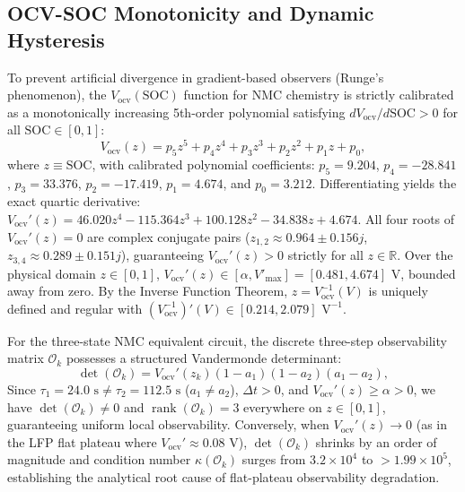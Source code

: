 \documentclass[balance,nocopyright,upint,varvw,hyphenate,barcolor=NavyBlue,nolists]{asmejour}
\begin{document}
\subsection{OCV-SOC Monotonicity and Dynamic Hysteresis}
To prevent artificial divergence in gradient-based observers (Runge's phenomenon), the $V_{\text{ocv}}(\text{SOC})$ function for NMC chemistry is strictly calibrated as a monotonically increasing 5th-order polynomial satisfying $d V_{\text{ocv}} / d\text{SOC} > 0$ for all $\text{SOC} \in [0, 1]$:
\begin{equation}\label{eqn:ocv_poly}
V_{\text{ocv}}(z) = p_5 z^5 + p_4 z^4 + p_3 z^3 + p_2 z^2 + p_1 z + p_0,
\end{equation}
where $z \equiv \text{SOC}$, with calibrated polynomial coefficients: $p_5 = 9.204$, $p_4 = -28.841$, $p_3 = 33.376$, $p_2 = -17.419$, $p_1 = 4.674$, and $p_0 = 3.212$. Differentiating yields the exact quartic derivative:
$V_{\text{ocv}}'(z) = 46.020 z^4 - 115.364 z^3 + 100.128 z^2 - 34.838 z + 4.674$. All four roots of $V_{\text{ocv}}'(z) = 0$ are complex conjugate pairs ($z_{1,2} \approx 0.964 \pm 0.156 j$, $z_{3,4} \approx 0.289 \pm 0.151 j$), guaranteeing $V_{\text{ocv}}'(z) > 0$ strictly for all $z \in \mathbb{R}$. Over the physical domain $z \in [0, 1]$, $V_{\text{ocv}}'(z) \in [\alpha, V'_{\max}] = [0.481, 4.674]\text{ V}$, bounded away from zero. By the Inverse Function Theorem, $z = V_{\text{ocv}}^{-1}(V)$ is uniquely defined and regular with $(V_{\text{ocv}}^{-1})'(V) \in [0.214, 2.079]\text{ V}^{-1}$.

For the three-state NMC equivalent circuit, the discrete three-step observability matrix $\mathcal{O}_k$ possesses a structured Vandermonde determinant:
\begin{equation}\label{eqn:det_obs}
\det(\mathcal{O}_k) = V_{\text{ocv}}'(z_k) (1 - a_1)(1 - a_2)(a_1 - a_2),
\end{equation}
Since $\tau_1 = 24.0\text{ s} \ne \tau_2 = 112.5\text{ s}$ ($a_1 \ne a_2$), $\Delta t > 0$, and $V_{\text{ocv}}'(z) \ge \alpha > 0$, we have $\det(\mathcal{O}_k) \ne 0$ and $\operatorname{rank}(\mathcal{O}_k) = 3$ everywhere on $z \in [0, 1]$, guaranteeing uniform local observability. Conversely, when $V_{\text{ocv}}'(z) \to 0$ (as in the LFP flat plateau where $V_{\text{ocv}}' \approx 0.08\text{ V}$), $\det(\mathcal{O}_k)$ shrinks by an order of magnitude and condition number $\kappa(\mathcal{O}_k)$ surges from $3.2 \times 10^4$ to $> 1.99 \times 10^5$, establishing the analytical root cause of flat-plateau observability degradation.
\end{document}
